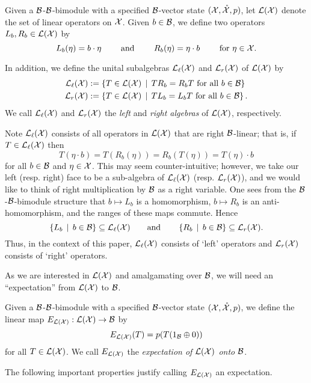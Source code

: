 \begin{definition}
	Given a $\mathcal{B}$-$\mathcal{B}$-bimodule with a specified $\mathcal{B}$-vector state $(\mathcal{X}, \mathring{\mathcal{X}}, p)$, let $\mathcal{L}(\mathcal{X})$ denote the set of linear operators on $\mathcal{X}$.
	Given $b \in \mathcal{B}$, we define two operators $L_b, R_b \in \mathcal{L}(\mathcal{X})$ by
	\[
		L_b(\eta) = b \cdot \eta \qquad \text{ and } \qquad R_b(\eta) = \eta \cdot b \qquad \text{ for } \eta \in \mathcal{X}.
	\]

	In addition, we define the unital subalgebras $\mathcal{L}_\ell(\mathcal{X})$ and $\mathcal{L}_r(\mathcal{X})$ of $\mathcal{L}(\mathcal{X})$ by
	\begin{align*}
		\mathcal{L}_\ell(\mathcal{X}) &:= \left\{ T \in \mathcal{L}(\mathcal{X}) \, \mid \, TR_b = R_b T \text{ for all }b \in \mathcal{B}\right\}\\
		\mathcal{L}_r(\mathcal{X}) &:= \left\{ T \in \mathcal{L}(\mathcal{X}) \, \mid \, TL_b = L_b T \text{ for all }b \in \mathcal{B}\right\}.
	\end{align*}
	We call $\mathcal{L}_\ell(\mathcal{X})$ and $\mathcal{L}_r(\mathcal{X})$ the \emph{left} and \emph{right algebras} of $\mathcal{L}(\mathcal{X})$, respectively.
\end{definition}

Note $\mathcal{L}_\ell(\mathcal{X})$ consists of all operators in $\mathcal{L}(\mathcal{X})$ that are right $\mathcal{B}$-linear; that is, if $T \in \mathcal{L}_\ell(\mathcal{X})$ then
\[
	T( \eta \cdot b) = T(R_b(\eta)) = R_b(T(\eta)) = T(\eta) \cdot b
\]
for all $b \in \mathcal{B}$ and $\eta \in \mathcal{X}$.
This may seem counter-intuitive; however, we take our left (resp. right) face to be a sub-algebra of $\mathcal{L}_\ell(\mathcal{X})$ (resp. $\mathcal{L}_r(\mathcal{X})$), and we would like to think of right multiplication by $\mathcal{B}$ as a right variable.
One sees from the $\mathcal{B}$-$\mathcal{B}$-bimodule structure that $b \mapsto L_b$ is a homomorphism, $b \mapsto R_b$ is an anti-homomorphism, and the ranges of these maps commute.
Hence
\[
	\left\{L_b \, \mid \, b \in \mathcal{B}\right\} \subseteq \mathcal{L}_\ell(\mathcal{X}) \qquad \text{and} \qquad \left\{R_b \, \mid \, b \in \mathcal{B}\right\} \subseteq \mathcal{L}_r(\mathcal{X}).
\]
Thus, in the context of this paper, $\mathcal{L}_\ell(\mathcal{X})$ consists of `left' operators and $\mathcal{L}_r(\mathcal{X})$ consists of `right' operators.

As we are interested in $\mathcal{L}(\mathcal{X})$ and amalgamating over $\mathcal{B}$, we will need an ``expectation'' from $\mathcal{L}(\mathcal{X})$ to $\mathcal{B}$.
\begin{definition}
	\label{defn:expectationofLXontoB}
	Given a $\mathcal{B}$-$\mathcal{B}$-bimodule with a specified $\mathcal{B}$-vector state $(\mathcal{X}, \mathring{\mathcal{X}}, p)$, we define the linear map $E_{\mathcal{L}(\mathcal{X})} : \mathcal{L}(\mathcal{X}) \to \mathcal{B}$ by
	\[
		E_{\mathcal{L}(\mathcal{X})}(T) = p(T(1_{\mathcal{B}} \oplus 0))
	\]
	for all $T \in \mathcal{L}(\mathcal{X})$.
	We call $E_{\mathcal{L}(\mathcal{X})}$ the \emph{expectation of $\mathcal{L}(\mathcal{X})$ onto $\mathcal{B}$}.
\end{definition}
The following important properties justify calling $E_{\mathcal{L}(\mathcal{X})}$ an expectation.


